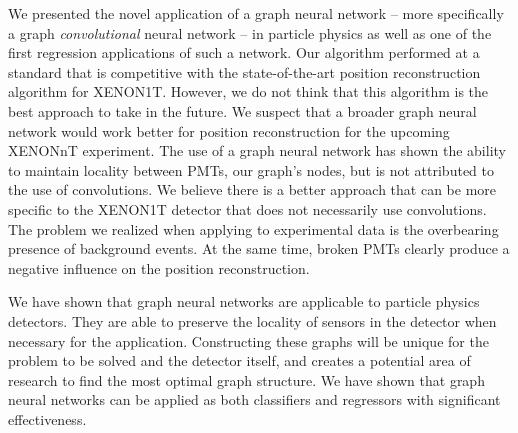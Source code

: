 \documentclass[../thesis.tex]{subfiles}
\begin{document}
We presented the novel application of a graph neural network -- more specifically a graph \textit{convolutional} neural network -- in particle physics as well as one of the first regression applications of such a network.
Our algorithm performed at a standard that is competitive with the state-of-the-art position reconstruction algorithm for XENON1T.
However, we do not think that this algorithm is the best approach to take in the future.
We suspect that a broader graph neural network would work better for position reconstruction for the upcoming XENONnT experiment.
The use of a graph neural network has shown the ability to maintain locality between PMTs, our graph's nodes, but is not attributed to the use of convolutions.
We believe there is a better approach that can be more specific to the XENON1T detector that does not necessarily use convolutions.
The problem we realized when applying to experimental data is the overbearing presence of background events.
At the same time, broken PMTs clearly produce a negative influence on the position reconstruction.

\par We have shown that graph neural networks are applicable to particle physics detectors.
They are able to preserve the locality of sensors in the detector when necessary for the application.
Constructing these graphs will be unique for the problem to be solved and the detector itself, and creates a potential area of research to find the most optimal graph structure.
We have shown that graph neural networks can be applied as both classifiers and regressors with significant effectiveness.
\end{document}
